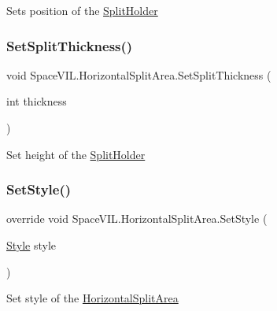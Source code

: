 Sets position of the \mbox{\hyperlink{class_space_v_i_l_1_1_split_holder}{Split\+Holder}} 

\mbox{\label{class_space_v_i_l_1_1_horizontal_split_area_a3e8b87474ea53742d5a84513f8867d4d}} 
\subsubsection{\texorpdfstring{Set\+Split\+Thickness()}{SetSplitThickness()}}
{\footnotesize\ttfamily void Space\+V\+I\+L.\+Horizontal\+Split\+Area.\+Set\+Split\+Thickness (\begin{DoxyParamCaption}\item[{int}]{thickness }\end{DoxyParamCaption})}



Set height of the \mbox{\hyperlink{class_space_v_i_l_1_1_split_holder}{Split\+Holder}} 

\mbox{\label{class_space_v_i_l_1_1_horizontal_split_area_a6731dd096f00f78595ea45d8993bc636}} 
\subsubsection{\texorpdfstring{Set\+Style()}{SetStyle()}}
{\footnotesize\ttfamily override void Space\+V\+I\+L.\+Horizontal\+Split\+Area.\+Set\+Style (\begin{DoxyParamCaption}\item[{\mbox{\hyperlink{class_space_v_i_l_1_1_decorations_1_1_style}{Style}}}]{style }\end{DoxyParamCaption})\hspace{0.3cm}{\ttfamily [virtual]}}



Set style of the \mbox{\hyperlink{class_space_v_i_l_1_1_horizontal_split_area}{Horizontal\+Split\+Area}} 



